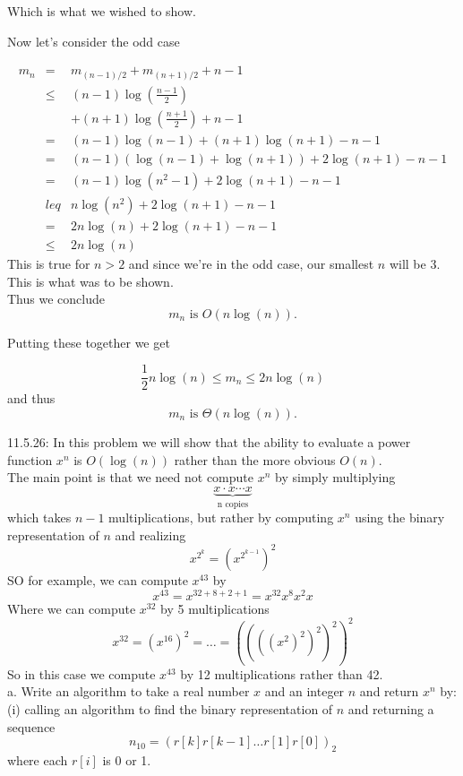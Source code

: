 \documentclass[16 pt]{amsart}
\theoremstyle{definition}
\theoremstyle{remark}
\numberwithin{equation}{subsection}
\newcommand{\half}{\frac{1}{2}}
\begin{document}
Which is what we wished to show.

\vspace{1in}
Now let's consider the odd case

\begin{eqnarray*}
m_n & = & m_{(n-1)/2} + m_{(n+1)/2} + n-1\\
    & \leq & (n-1)\log\left(\frac{n-1}{2}\right)\\
    &      & + (n+1)\log\left(\frac{n+1}{2}\right) + n-1\\
    & = & (n-1)\log(n-1)+(n+1)\log(n+1) - n-1\\
    & = & (n-1)(\log(n-1)+\log(n+1)) + 2\log(n+1)- n-1\\
    & = & (n-1)\log(n^2-1) + 2\log(n+1) -n-1\\
    & leq & n\log(n^2)+2\log(n+1) -n-1\\
    & = & 2n\log(n) +2\log(n+1) -n - 1 \\
    & \leq & 2n \log(n)
\end{eqnarray*}
This is true for $n>2$ and since we're in the odd case, our smallest $n$ will be 3.
This is what was to be shown.\\

Thus we conclude
\[
m_n \text{ is } O(n\log(n)).
\]

Putting these together we get

\[
\half n \log(n) \leq m_n \leq 2n\log(n) 
\]
and thus
\[
m_n \text{ is } \Theta(n\log(n)).
\]
\newpage

11.5.26:  In this problem we will show that the ability to evaluate a power function $x^n$ is $O(\log(n))$ rather than the more obvious $O(n)$.\\

The main point is that we need not compute $x^n$ by simply multiplying 
\[
\underbrace{x\cdot x\cdots x}_\text{n copies}
\]
which takes $n-1$ multiplications, but rather by computing $x^n$ using the binary representation of $n$ and realizing
\[
x^{2^k} = (x^{2^{k-1}})^2
\]
SO for example, we can compute $x^{43}$ by
\[
x^{43} = x^{32+8+2+1}=x^{32}x^{8}x^2 x 
\]
Where we can compute $x^{32}$ by 5 multiplications
\[
x^{32}= (x^{16})^2= \dots = ((((x^2)^2)^2)^2)^2
\]
So in this case we compute $x^{43}$ by 12 multiplications rather than 42.\\



a. Write an algorithm to take a real number $x$ and an integer $n$ and return $x^n$ by:\\
(i) calling an algorithm to find the binary representation of $n$ and returning a sequence
\[
n_{10} = (r[k]r[k-1]\dots r[1]r[0])_2
\]
where each $r[i]$ is 0 or 1.\\
\end{document}
